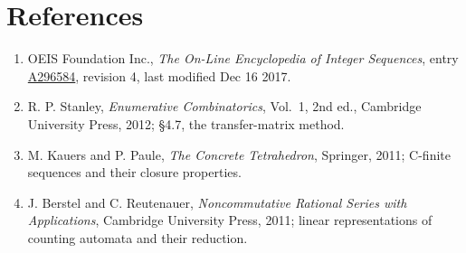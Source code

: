 \documentclass[11pt]{article}
\theoremstyle{definition}
\begin{document}
\section{References}

\begin{enumerate}

\item OEIS Foundation Inc., \emph{The On-Line Encyclopedia of Integer Sequences}, entry \href{https://oeis.org/A296584}{A296584}, revision 4, last modified Dec 16 2017.

\item R. P. Stanley, \emph{Enumerative Combinatorics}, Vol.~1, 2nd ed., Cambridge University Press, 2012; \S4.7, the transfer-matrix method.

\item M. Kauers and P. Paule, \emph{The Concrete Tetrahedron}, Springer, 2011; C-finite sequences and their closure properties.

\item J. Berstel and C. Reutenauer, \emph{Noncommutative Rational Series with Applications}, Cambridge University Press, 2011; linear representations of counting automata and their reduction.

\end{enumerate}
\end{document}
